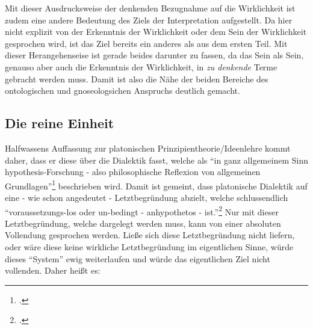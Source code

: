 Mit dieser Ausdrucksweise der denkenden Bezugnahme auf die Wirklichkeit ist zudem eine andere Bedeutung des Ziels der Interpretation aufgestellt. Da hier nicht explizit von der Erkenntnis der Wirklichkeit oder dem Sein der Wirklichkeit gesprochen wird, ist das Ziel bereits ein anderes als aus dem ersten Teil. Mit dieser Herangehenseise ist gerade beides darunter zu fassen, da das Sein als Sein, genauso aber auch die Erkenntnis der Wirklichkeit, in \emph{zu denkende} Terme gebracht werden muss. Damit ist also die Nähe der beiden Bereiche des ontologischen und gnoseologsichen Anspruchs deutlich gemacht.


\subsection{Die reine Einheit}
Halfwassens Auffassung zur platonischen Prinzipientheorie/Ideenlehre kommt daher, dass er diese über die Dialektik fasst, welche als \enquote{in ganz allgemeinem Sinn hypothesis-Forschung - also philosophische Reflexion von allgemeinen Grundlagen}\footcite[][S. 94]{halfwassen2015spuren} beschrieben wird. Damit ist gemeint, dass platonische Dialektik auf eine - wie schon angedeutet - Letztbegründung abzielt, welche schlussendlich \enquote{voraussetzungs-los oder un-bedingt - anhypothetos - ist.}\footcite[][S. 95]{halfwassen2015spuren}
Nur mit dieser Letztbegründung, welche dargelegt werden muss, kann von einer absoluten Vollendung gesprochen werden. Ließe sich diese Letztbegründung nicht liefern, oder wäre diese keine wirkliche Letztbegründung im eigentlichen Sinne, würde dieses \enquote{System} ewig weiterlaufen und würde das eigentlichen Ziel nicht vollenden. Daher heißt es: 
